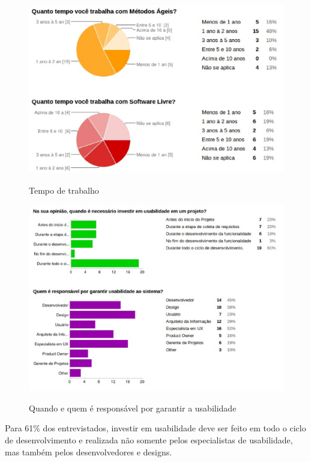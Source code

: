 	\begin{figure}[!h]
    	\centering
    	\includegraphics[keepaspectratio=true,scale=0.55]
      		{figuras/tempo_trabalho.eps}
    	\label{concepcao}
		\caption{Tempo de trabalho}
	\end{figure}			
	\begin{figure}[!h]
    	\centering
    	\includegraphics[keepaspectratio=true,scale=0.55]
      		{figuras/quando_e_quem.eps}
    	\label{concepcao}
		\caption{Quando e quem é responsável por garantir a usabilidade}
	\end{figure}

Para 61\% dos entrevistados, investir em usabilidade deve ser feito em todo o ciclo de desenvolvimento e realizada não somente pelos especialistas de usabilidade, mas também pelos desenvolvedores e designs.

